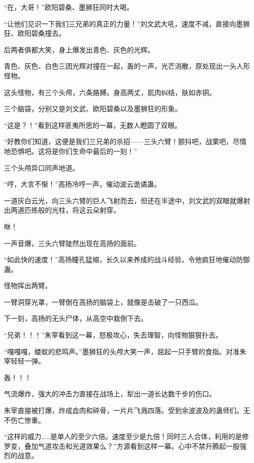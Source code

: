 
\begin{this_body}



“在，大哥！”欧阳碧桑、墨狮狂同时大喝。

“让他们见识一下我们三兄弟的真正的力量！”刘文武大吼，速度不减，直接向墨狮狂、欧阳碧桑撞去。

后两者俱都大笑，身上爆发出青色、灰色的光辉。

青色、灰色、白色三团光辉对撞在一起，轰的一声，光芒消散，原处现出一头人形怪物。

这头怪物，有三个头颅，六条胳膊。身高两丈，肌肉纠结，肤如赤铜。

三个脑袋，分别又是刘文武、欧阳碧桑以及墨狮狂的形象。

“这是？！”看到这样匪夷所思的一幕，无数人瞪圆了双眼。

“好教你们知道，这便是我们三兄弟的杀招——三头六臂！颤抖吧，战栗吧，尽情地恐惧吧。这将是你们生命中最后的一刻！”

三个头颅异口同声地道。

“哼，大言不惭！”高扬冷哼一声，催动波云诡谲蛊。

一道灰白云光，向三头六臂的巨人飞射而去，但还在半途中，刘文武的双眼就爆射出两道匹练般的光柱，将这云朵射穿。

咻！

一声音爆，三头六臂陡然出现在高扬的面前。

“如此快的速度！”高扬瞳孔猛缩，长久以来养成的战斗经验，令他疯狂地催动防御蛊。

怪物挥出两臂。

一臂洞穿光罩，一臂倒在高扬的脑袋上，就像是击破了一只西瓜。

下一刻，高扬的无头尸体，从高空中栽倒下去。

“兄弟！！！”朱宰看到这一幕，怒极攻心，失去理智，向怪物狠狠扑去。

“嘎嘎嘎，蝼蚁的悲鸣声。”墨狮狂的头颅大笑一声，屈起一只手臂的食指。对准朱宰轻轻一弹。

轰！！！

气流爆炸，强大的冲击力直接在战场上，犁出一道长达数千步的伤口。

朱宰直接被打爆，炸成血肉和碎骨，一片片飞溅四落。受到余波波及的蛊师们。无不伤亡惨重。

“这样的威力……是单人的至少六倍。速度至少是九倍！同时三人合体，利用的是修罗变，叠加气道攻击和光道效果么？”方源看到这样一幕。心中不禁升腾起一股强烈的战意。


\end{this_body}
